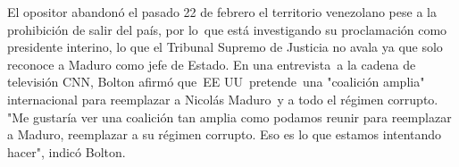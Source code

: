 \documentclass{article}%
\begin{document}
\newline%
%
El opositor abandonó el pasado 22 de febrero el territorio venezolano pese a la prohibición de salir del país, por lo~que está investigando su proclamación como presidente interino, lo que el Tribunal Supremo de Justicia no avala ya que solo reconoce a Maduro como jefe de Estado.%
\newline%
%
En una entrevista~a la cadena de televisión CNN, Bolton afirmó que~EE UU~pretende~una "coalición amplia" internacional para reemplazar a Nicolás Maduro~y a todo el régimen corrupto.%
\newline%
%
"Me gustaría ver una coalición tan amplia como podamos reunir para reemplazar a Maduro, reemplazar a su régimen corrupto. Eso es lo que estamos intentando hacer", indicó Bolton.%
\newline%
%
\end{document}
